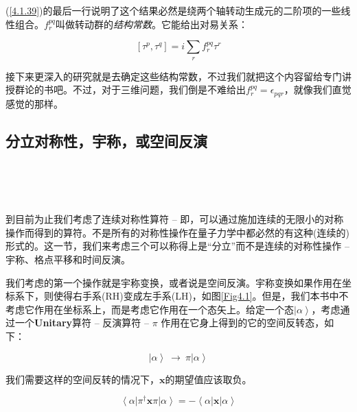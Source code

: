\documentclass[UTF8,twoside]{ctexart}
\begin{document}
\noindent (\ref{4.1.39})的最后一行说明了这个结果必然是绕两个轴转动生成元的二阶项的一些线性组合。$f_r^{pq}$叫做转动群的{\it{结构常数}}。它能给出对易关系：

\begin{equation}
\left[\tau^p, \tau^q\right] = i\sum_r f_r^{pq} \tau^r
\end{equation}

\noindent 接下来更深入的研究就是去确定这些结构常数，不过我们就把这个内容留给专门讲授群论的书吧。不过，对于三维问题，我们倒是不难给出$f_r^{pq} = \epsilon_{pqr}$，就像我们直觉感觉的那样。

\subsection{分立对称性，宇称，或空间反演}\label{Sec4.2}


\noindent \\

\noindent {}  \\

\


\noindent 到目前为止我们考虑了连续对称性算符 -- 即，可以通过施加连续的无限小的对称操作而得到的算符。不是所有的对称性操作在量子力学中都必然的有这种(连续的)形式的。这一节，我们来考虑三个可以称得上是“分立”而不是连续的对称性操作 -- 宇称、格点平移和时间反演。

我们考虑的第一个操作就是宇称变换，或者说是空间反演。宇称变换如果作用在坐标系下，则使得右手系(RH)变成左手系(LH)，如图{\ref{Fig4.1}}。但是，我们本书中不考虑它作用在坐标系上，而是考虑它作用在一个态矢上。给定一个态$\left|\alpha\right\rangle$，考虑通过一个{\textbf{Unitary}}算符 -- 反演算符 -- $\pi$ 作用在它身上得到的它的空间反转态，如下：

\begin{equation}
\left|\alpha\right\rangle\ \rightarrow\ \pi\left|\alpha\right\rangle
\end{equation}

\noindent 我们需要这样的空间反转的情况下，$\bm x$的期望值应该取负。

\begin{equation}
\left\langle\alpha\right|\pi^{\dagger}\bm{x}\pi\left|\alpha\right\rangle =  -\left\langle\alpha\right|\bm{x}\left|\alpha\right\rangle
\end{equation}
\end{document}
